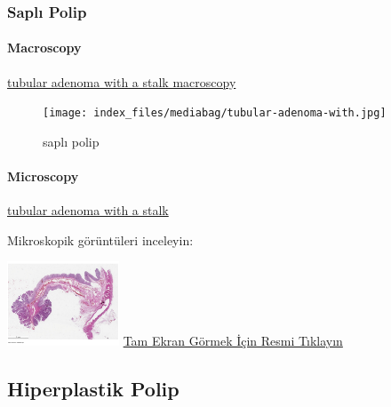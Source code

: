 \documentclass[
  letterpaper,
  DIV=11,
  numbers=noendperiod]{scrreprt}
\let\oldparagraph\paragraph
\renewcommand{\paragraph}[1]{\oldparagraph{#1}\mbox{}}
\begin{document}
\hypertarget{sec-kolon-sapli-polip}{%
\subsubsection{Saplı Polip}\label{sec-kolon-sapli-polip}}

\hypertarget{macroscopy-1}{%
\paragraph{Macroscopy}\label{macroscopy-1}}

\href{https://images.patolojiatlasi.com/tubularadenoma/tubular-adenoma-with-stalk-macroscopy.jpg}{tubular
adenoma with a stalk macroscopy}

\begin{figure}

{\centering \texttt{[image: index\_files/mediabag/tubular-adenoma-with.jpg]}

}

\caption{saplı polip}

\end{figure}

\hypertarget{microscopy}{%
\paragraph{Microscopy}\label{microscopy}}

\href{https://images.patolojiatlasi.com/tubularadenoma/tubular-adenoma-with-stalk.jpeg}{tubular
adenoma with a stalk}

Mikroskopik görüntüleri inceleyin:

\href{https://images.patolojiatlasi.com/tubularadenoma/tubular-adenoma-with-stalk/viewer_z0.html}{\includegraphics[width=0.25\textwidth,height=\textheight]{./screenshots/thumbnail_tubular-adenoma-with-stalk.png}}
\href{https://images.patolojiatlasi.com/tubularadenoma/tubular-adenoma-with-stalk/viewer_z0.html}{Tam
Ekran Görmek İçin Resmi Tıklayın}

\hypertarget{sec-kolon-hiperplastik-polip}{%
\subsection{Hiperplastik Polip}\label{sec-kolon-hiperplastik-polip}}
\end{document}
